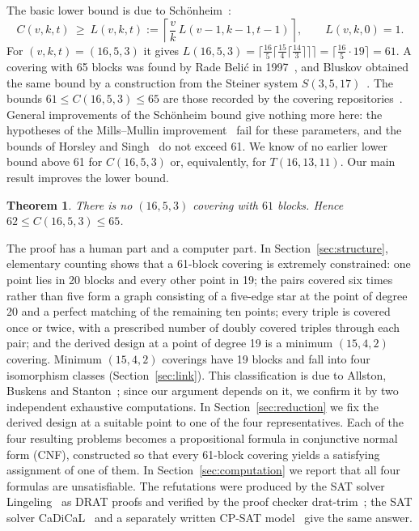 \documentclass[11pt]{amsart}
\newtheorem{theorem}{Theorem}[section]
\theoremstyle{definition}
\theoremstyle{remark}
\begin{document}
The basic lower bound is due to Sch\"onheim~\cite{schonheim1964}:
\[
C(v,k,t)\ \ge\ L(v,k,t) := \left\lceil \frac{v}{k}\, L(v-1,k-1,t-1)\right\rceil,
\qquad L(v,k,0)=1 .
\]
For $(v,k,t)=(16,5,3)$ it gives
$L(16,5,3)=\lceil \tfrac{16}{5}\lceil \tfrac{15}{4}\lceil
\tfrac{14}{3}\rceil\rceil\rceil=\lceil \tfrac{16}{5}\cdot 19\rceil=61$.
A covering with 65 blocks was found by Rade Beli\'c in 1997~\cite{ljcr}, and Bluskov
obtained the same bound by a construction from the Steiner system
$S(3,5,17)$~\cite[Corollary~2.3.18]{bluskov1997}. The bounds
$61\le C(16,5,3)\le 65$ are those recorded by the covering
repositories~\cite{ljcr,coveringrepo}. General improvements of the
Sch\"onheim bound give nothing more here: the hypotheses of the Mills--Mullin
improvement~\cite{millsmullin1992} fail for these parameters, and the bounds
of Horsley and Singh~\cite{horsley2018} do not exceed 61. We know of no
earlier lower bound above 61 for $C(16,5,3)$ or, equivalently, for
$T(16,13,11)$. Our main result improves the lower bound.

\begin{theorem}\label{thm:main}
There is no $(16,5,3)$ covering with $61$ blocks. Hence
$62\le C(16,5,3)\le 65$.
\end{theorem}

The proof has a human part and a computer part. In
Section~\ref{sec:structure}, elementary counting shows that a 61-block
covering is extremely constrained: one point lies in 20 blocks and every
other point in 19; the pairs covered six times rather than five form a graph
consisting of a five-edge star at the point of degree 20 and a perfect
matching of the remaining ten points; every triple is covered once or twice,
with a prescribed number of doubly covered triples through each pair; and the
derived design at a point of degree 19 is a minimum $(15,4,2)$ covering. Minimum $(15,4,2)$ coverings have 19 blocks and fall into
four isomorphism classes (Section~\ref{sec:link}). This classification is due
to Allston, Buskens and Stanton~\cite{allston1988}; since our argument
depends on it, we confirm it by two independent exhaustive computations. In
Section~\ref{sec:reduction} we fix the derived design at a suitable point to
one of the four representatives. Each of the four resulting problems becomes a
propositional formula in conjunctive normal form (CNF), constructed so that
every 61-block covering yields a satisfying assignment of one of them. In
Section~\ref{sec:computation} we report that all four formulas are
unsatisfiable. The refutations were produced by the SAT solver
Lingeling~\cite{lingeling} as DRAT proofs and verified by the proof checker
drat-trim~\cite{wetzler2014}; the SAT solver CaDiCaL~\cite{cadical} and a
separately written CP-SAT model~\cite{ortools} give the same answer.
\end{document}

